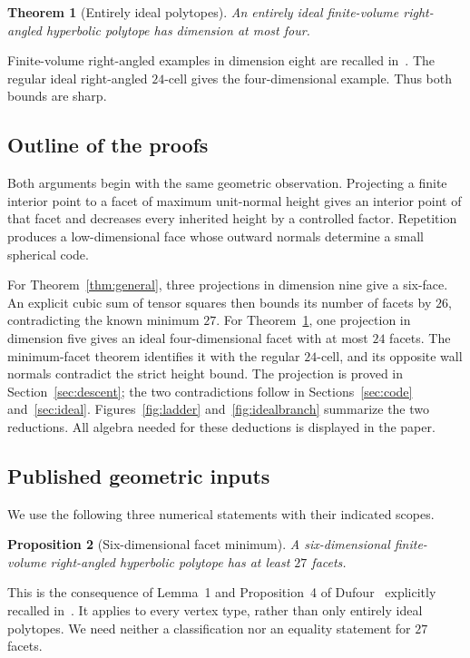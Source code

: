 \documentclass[11pt]{article}
\newtheorem{theorem}{Theorem}
\newtheorem{proposition}[theorem]{Proposition}
\theoremstyle{remark}
\begin{document}
\begin{theorem}[Entirely ideal polytopes]\label{thm:ideal}
An entirely ideal finite-volume right-angled hyperbolic polytope has
dimension at most four.
\end{theorem}

Finite-volume right-angled examples in dimension eight are recalled
in~\cite{PV}. The regular ideal right-angled $24$-cell gives the
four-dimensional example. Thus both bounds are sharp.

\subsection{Outline of the proofs}
Both arguments begin with the same geometric observation. Projecting
a finite interior point to a facet of maximum unit-normal height
gives an interior point of that facet and decreases every inherited
height by a controlled factor. Repetition produces a low-dimensional
face whose outward normals determine a small spherical code.

For Theorem~\ref{thm:general}, three projections in dimension nine
give a six-face. An explicit cubic sum of tensor squares then bounds
its number of facets by $26$, contradicting the known minimum $27$.
For Theorem~\ref{thm:ideal}, one projection in dimension five gives
an ideal four-dimensional facet with at most $24$ facets. The
minimum-facet theorem identifies it with the regular $24$-cell, and
its opposite wall normals contradict the strict height bound.
The projection is proved in Section~\ref{sec:descent}; the two
contradictions follow in Sections~\ref{sec:code} and~\ref{sec:ideal}.
Figures~\ref{fig:ladder} and~\ref{fig:idealbranch} summarize the two
reductions. All algebra needed for these deductions is displayed in
the paper.

\subsection{Published geometric inputs}
We use the following three numerical statements with their indicated
scopes.

\begin{proposition}[Six-dimensional facet minimum]\label{prop:27}
A six-dimensional finite-volume right-angled hyperbolic polytope
has at least $27$ facets.
\end{proposition}

This is the consequence of Lemma~1 and Proposition~4 of
Dufour~\cite{Dufour} explicitly recalled in~\cite[Section~4]{Alex}.
It applies to every vertex type, rather than only entirely ideal
polytopes. We need neither a classification nor an equality statement
for $27$ facets.
\end{document}
